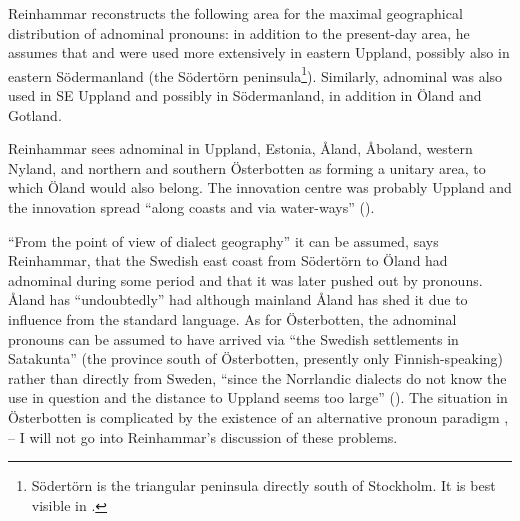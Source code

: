 Reinhammar reconstructs the following area for the maximal geographical distribution of adnominal pronouns: in addition to the present-day area, he assumes that  and  were used more extensively in eastern Uppland, possibly also in eastern Södermanland (the Södertörn peninsula\footnote{ Södertörn is the triangular peninsula directly south of Stockholm. It is best visible in .}). Similarly, adnominal was also used in SE Uppland and possibly in Södermanland, in addition in Öland and Gotland. 

Reinhammar sees adnominal in Uppland, Estonia, Åland, Åboland, western Nyland, and northern and southern Österbotten as forming a unitary area, to which Öland would also belong. The innovation centre was probably Uppland and the innovation spread “along coasts and via water-ways” (\citealt[115]{Reinhammar1975}).

“From the point of view of dialect geography” it can be assumed, says Reinhammar, that the Swedish east coast from Södertörn to Öland had adnominal  during some period and that it was later pushed out by pronouns. Åland has “undoubtedly” had although mainland Åland has shed it due to influence from the standard language. As for Österbotten, the adnominal pronouns can be assumed to have arrived via “the Swedish settlements in Satakunta” (the province south of Österbotten, presently only Finnish-speaking) rather than directly from Sweden, “since the Norrlandic dialects do not know the use in question and the distance to Uppland seems too large” (\citealt[116]{Reinhammar1975}). The situation in Österbotten is complicated by the existence of an alternative pronoun paradigm ,  – I will not go into Reinhammar’s discussion of these problems. 

